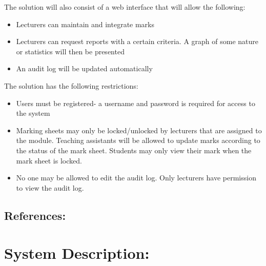 \documentclass[12pt]{article}
\begin{document}
		\vspace{0.5cm}
		
		\begin{flushleft}	
		The solution will also consist of a web interface that will allow the following:
		\end{flushleft}
			\begin{itemize}
				\item Lecturers can maintain and integrate marks
				\item Lecturers can request reports with a certain criteria. A graph of some nature or statistics will then be presented 
				\item An audit log will be updated automatically 
			\end{itemize} 
			
		\vspace{0.5cm}
			
		\begin{flushleft}		
		The solution has the following restrictions:
		\end{flushleft}
			\begin{itemize}
				\item Users must be registered- a username and password is required for access to the system
				\item Marking sheets may only be locked/unlocked by lecturers that are assigned to the module. Teaching assistants will be allowed to update marks according to the status of the mark sheet. Students may only view their mark when the mark sheet is locked.
				\item No one may be allowed to edit the audit log. Only lecturers have permission to view the audit log.
			\end{itemize}		

	\vspace{0.2in}
	
		\subsection{References:}
		\vspace{0.1in}
			
	
	\vspace{0.5in}
	
	\section{System Description:}
	\vspace{0.2in}
	
\end{document}
